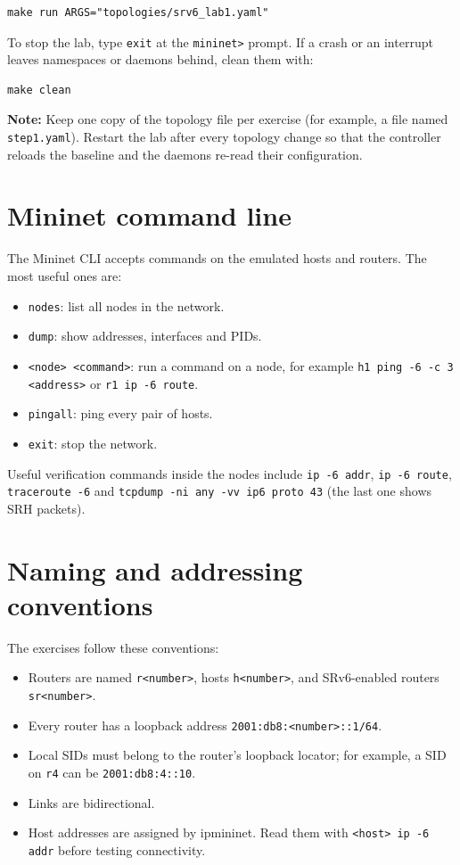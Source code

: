 \documentclass[11pt,letterpaper]{report}
\newcommand{\note}[1]{\par\medskip\noindent\textbf{Note:} #1\par}
\newcommand{\code}[1]{\texttt{#1}}
\begin{document}
\begin{lstlisting}
make run ARGS="topologies/srv6_lab1.yaml"
\end{lstlisting}

To stop the lab, type \code{exit} at the \code{mininet>} prompt.  If a crash or
an interrupt leaves namespaces or daemons behind, clean them with:

\begin{lstlisting}
make clean
\end{lstlisting}

\note{Keep one copy of the topology file per exercise (for example, a file
named \code{step1.yaml}).  Restart the lab after every topology change so
that the controller reloads the baseline and the daemons re-read their
configuration.}

\section{Mininet command line}

The Mininet CLI accepts commands on the emulated hosts and routers.  The most
useful ones are:

\begin{itemize}
  \item \code{nodes}: list all nodes in the network.
  \item \code{dump}: show addresses, interfaces and PIDs.
  \item \code{<node> <command>}: run a command on a node, for example
        \code{h1 ping -6 -c 3 <address>} or \code{r1 ip -6 route}.
  \item \code{pingall}: ping every pair of hosts.
  \item \code{exit}: stop the network.
\end{itemize}

Useful verification commands inside the nodes include \code{ip -6 addr},
\code{ip -6 route}, \code{traceroute -6} and
\code{tcpdump -ni any -vv ip6 proto 43} (the last one shows SRH packets).

\section{Naming and addressing conventions}

The exercises follow these conventions:

\begin{itemize}
  \item Routers are named \code{r<number>}, hosts \code{h<number>}, and
        SRv6-enabled routers \code{sr<number>}.
  \item Every router has a loopback address
        \code{2001:db8:<number>::1/64}.
  \item Local SIDs must belong to the router's loopback locator; for example,
        a SID on \code{r4} can be \code{2001:db8:4::10}.
  \item Links are bidirectional.
  \item Host addresses are assigned by ipmininet.  Read them with
        \code{<host> ip -6 addr} before testing connectivity.
\end{itemize}
\end{document}
